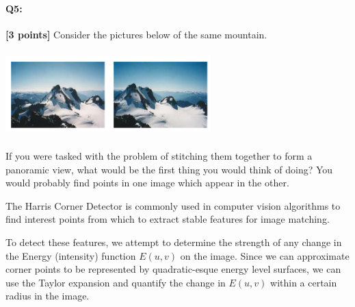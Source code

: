 \documentclass[11pt]{article}
\begin{document}
\begin{enumerate}[(a)]

\end{enumerate}

\pagebreak




\pagebreak
\paragraph{Q5:} \textbf{[3 points]}
Consider the pictures below of the same mountain.

\begin{center}
\includegraphics[width=300px,height=125px]{images/harris_mountains.png} 
\end{center}

If you were tasked with the problem of stitching them together to form a panoramic view, what would be the first thing you would think of doing?  You would probably find points in one image which appear in the other.

The Harris Corner Detector is commonly used in computer vision algorithms to find interest points from which to extract stable features for image matching.

To detect these features, we attempt to determine the strength of any change in the Energy (intensity) function $E(u, v)$ on the image. Since we can approximate corner points to be represented by quadratic-esque energy level surfaces, we can use the Taylor expansion and quantify the change in $E(u, v)$ within a certain radius in the image.
\end{document}
